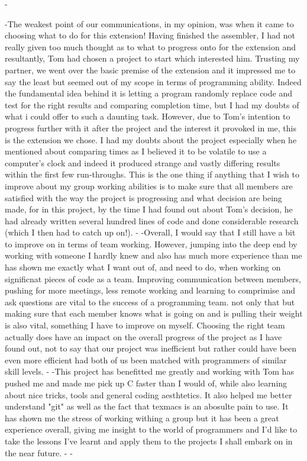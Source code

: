 -\documentclass[11pt]{article}
\begin{document}
-The weakest point of our communications, in my opinion, was when it came to choosing what to do for this extension! Having finished the assembler, I had not really given too much thought as to what to progress onto for the extension and resultantly, Tom had chosen a project to start which interested him. Trusting my partner, we went over the basic premise of the extension and it impressed me to say the least but seemed out of my scope in terms of programming ability. Indeed the fundamental idea behind it is letting a program randomly replace code and test for the right results and comparing completion time, but I had my doubts of what i could offer to such a daunting task. However, due to Tom's intention to progress further with it after the project and the interest it provoked in me, this is the extension we chose. I had my doubts about the project especially when he mentioned about comparing times as I believed it to be volatile to use a computer's clock and indeed it produced strange and vastly differing results within the first few run-throughs. This is the one thing if anything that I wish to improve about my group working abilities is to make sure that all members are satisfied with the way the project is progressing and what decision are being made, for in this project, by the time I had found out about Tom's decision, he had already written several hundred lines of code and done considerable research (which I then had to catch up on!).
-
-Overall, I would say that I still have a bit to improve on in terms of team working. However, jumping into the deep end by working with someone I hardly knew and also has much more experience than me has shown me exactly what I want out of, and need to do, when working on significnat pieces of code as a team. Improving communication between members, pushing for more meetings, less remote working and learning to comprimise and ask questions are vital to the success of a programming team. not only that but making sure that each member knows what is going on and is pulling their weight is also vital, something I have to improve on myself. Choosing the right team actually does have an impact on the overall progress of the project as I have found out, not to say that our project was inefficient but rather could have been even more efficient had both of us been matched with programmers of similar skill levels.
-
-This project has benefitted me greatly and working with Tom has pushed me and made me pick up C faster than I would of, while also learning about nice tricks, tools and general coding aesthtetics. It also helped me better understand "git" as well as the fact that texmacs is an abosulte pain to use. It has shown me the stress of working withing a group but it has been a great experience overall, giving me insight to the world of programmers and I'd like to take the lessons I've learnt and apply them to the projects I shall embark on in the near future.
-
-
\end{document}
